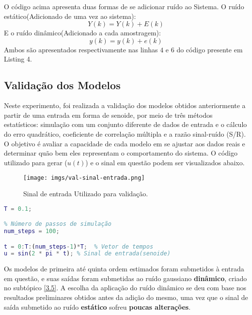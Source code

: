 \documentclass[a4paper,12pt]{article}
\begin{document}
O código acima apresenta duas formas de se adicionar ruído ao Sistema. O ruído estático(Adicionado de uma vez ao sistema):
\begin{equation*}
    Y(k) = Y(k) + E(k) \tag{3.5.1}
\end{equation*}
E o ruído dinâmico(Adicionado a cada amostragem):
\begin{equation*}
    y(k) = y(k) + e(k) \tag{3.5.2}
\end{equation*}
Ambos são apresentados respectivamente nas linhas $4$ e $6$ do código presente em Listing 4.

\subsection{Validação dos Modelos}\label{3.6}

Neste experimento, foi realizada a validação dos modelos obtidos anteriormente a partir de uma entrada em forma de senoide, por meio de três métodos estatísticos: simulação com um conjunto diferente de dados de entrada e o cálculo do erro quadrático, coeficiente de correlação múltipla e a razão sinal-ruído (S/R). O objetivo é avaliar a capacidade de cada modelo em se ajustar aos dados reais e determinar quão bem eles representam o comportamento do sistema. O código utilizado para gerar ($u(t)$) e o sinal em questão podem ser visualizados abaixo.

\begin{figure}[h!]\label{validacao-sinal}
  \centering
  \texttt{[image: imgs/val-sinal-entrada.png]}
  \caption{Sinal de entrada Utilizado para validação.}
\end{figure}

\begin{lstlisting}[language=Matlab, caption=$u(t)$ para validação]
% Tempo de amostragem
T = 0.1;

% Número de passos de simulação
num_steps = 100;

t = 0:T:(num_steps-1)*T;  % Vetor de tempos
u = sin(2 * pi * t); % Sinal de entrada(senoide)
\end{lstlisting}

Os modelos de primeira até quinta ordem estimados foram submetidos à entrada em questão, e suas saídas foram submetidas ao ruído gaussiano \textbf{dinâmico}, criado no subtópico \ref{3.5}. A escolha da aplicação do ruído dinâmico se deu com base nos resultados preliminares obtidos antes da adição do mesmo, uma vez que o sinal de saída submetido ao ruído \textbf{estático} sofreu \textbf{poucas alterações}. 
\end{document}
